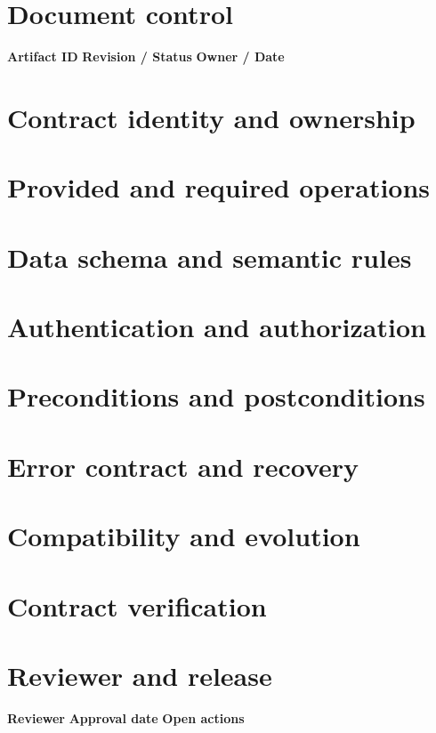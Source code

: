 \documentclass[10pt,letterpaper]{article}
\begin{document}
\DocProvenance
\section{Document control}
\textbf{Artifact ID}
\textbf{Revision / Status}
\textbf{Owner / Date}
\section{Contract identity and ownership}
\section{Provided and required operations}
\section{Data schema and semantic rules}
\section{Authentication and authorization}
\section{Preconditions and postconditions}
\section{Error contract and recovery}
\section{Compatibility and evolution}
\section{Contract verification}
\section{Reviewer and release}
\textbf{Reviewer}
\textbf{Approval date}
\textbf{Open actions}
\end{document}
